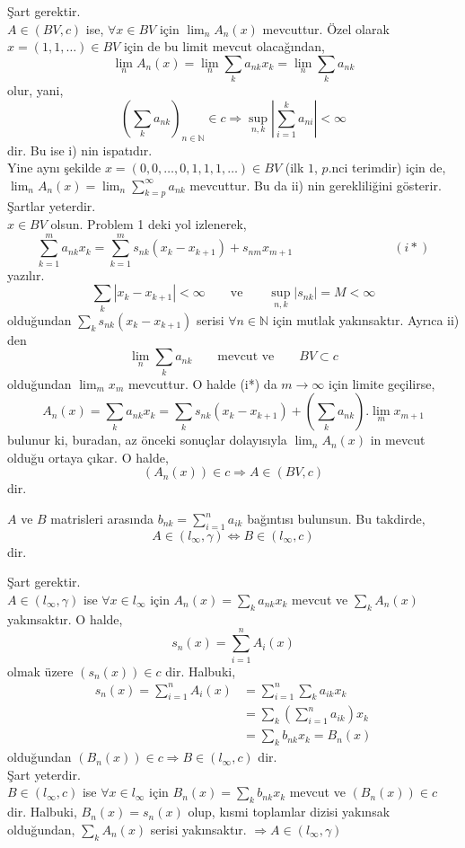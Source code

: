 \begin{coz}
Şart gerektir.\\[5pt]
$A\in (BV,c)$ ise, $\forall x\in BV$ için $\lim_nA_n(x)$ mevcuttur. Özel olarak $x=(1,1,\ldots)\in BV$ için de bu limit mevcut olacağından,
$$
\lim_nA_n(x)=\lim_n\sum_ka_{nk}x_k=\lim_n\sum_ka_{nk}
$$
olur, yani,
$$
\left(\sum_ka_{nk}\right)_{n\in\mathbb{N}}\in c\Rightarrow\sup_{n,k}\left|\sum\limits_{i=1}^ka_{ni}\right|<\infty
$$dir. Bu ise i) nin ispatıdır.\\[5pt]
Yine aynı şekilde $x=(0,0,\ldots,0,1,1,1,\ldots)\in BV$ (ilk $1$, $p$.nci terimdir) için de, $\lim_nA_n(x)=\lim_n\sum\limits_{k=p}^\infty a_{nk}$ mevcuttur. Bu da ii) nin gerekliliğini gösterir.\\[5pt]

Şartlar yeterdir.\\[5pt]
$x\in BV$ olsun. Problem 1 deki yol izlenerek,
$$
\sum\limits_{k=1}^ma_{nk}x_k=\sum\limits_{k=1}^m s_{nk}(x_k-x_{k+1})+s_{nm}x_{m+1}\qquad\qquad\qquad\qquad(i*)
$$
yazılır.
$$
\sum_k|x_k-x_{k+1}|<\infty\qquad\text{ve}\qquad\sup_{n,k}|s_{nk}|=M<\infty
$$
olduğundan $\sum\limits_ks_{nk}(x_k-x_{k+1})$ serisi $\forall n\in\mathbb{N}$ için mutlak yakınsaktır. Ayrıca ii) den
$$
\lim_n\sum_ka_{nk}\qquad\text{mevcut ve}\qquad BV\subset c
$$
olduğundan $\lim_mx_m$ mevcuttur. O halde (i*) da $m\to\infty$ için limite geçilirse,
$$
A_n(x)=\sum_ka_{nk}x_k=\sum_ks_{nk}(x_k-x_{k+1})+\left(\sum_ka_{nk}\right).\lim_mx_{m+1}
$$
bulunur ki, buradan, az önceki sonuçlar dolayısıyla $\lim_nA_n(x)$ in mevcut olduğu ortaya çıkar. O halde,
$$
(A_n(x))\in c\Rightarrow A\in (BV,c)
$$
dir.
\end{coz}
\begin{prob}
$A$ ve $B$ matrisleri arasında $b_{nk}=\sum\limits_{i=1}^na_{ik}$ bağıntısı bulunsun. Bu takdirde,
$$
A\in(l_\infty,\gamma)\iff B\in(l_\infty,c)
$$dir.
\end{prob}
\begin{coz}
Şart gerektir.\\[5pt]
$A\in(l_\infty,\gamma)$ ise $\forall x\in l_\infty$ için $A_n(x)=\sum_ka_{nk}x_k$ mevcut ve $\sum_kA_n(x)$ yakınsaktır. O halde,
$$
s_n(x)=\sum\limits_{i=1}^nA_i(x)
$$
olmak üzere $(s_n(x))\in c$ dir. Halbuki,
$$
\begin{aligned}
s_n(x)=\sum\limits_{i=1}^nA_i(x)&=\sum\limits_{i=1}^n\sum_ka_{ik}x_k\\
&=\sum_k\left(\sum\limits_{i=1}^na_{ik}\right)x_k\\
&=\sum_kb_{nk}x_k=B_n(x)
\end{aligned}
$$
olduğundan $(B_n(x))\in c\Rightarrow B\in(l_\infty, c)$ dir.\\[5pt]
Şart yeterdir.\\[5pt]

$B\in(l_\infty, c)$ ise $\forall x\in l_\infty$ için $B_n(x)=\sum\limits_kb_{nk}x_k$ mevcut ve $(B_n(x))\in c$ dir. Halbuki, $B_n(x)=s_n(x)$ olup, kısmi toplamlar dizisi yakınsak olduğundan, $\sum_kA_n(x)$ serisi yakınsaktır. $\Rightarrow A\in(l_\infty,\gamma)$
\end{coz}\
